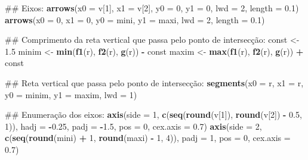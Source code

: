 \documentclass[]{book}
\newenvironment{Shaded}{\begin{snugshade}}{\end{snugshade}}
\newcommand{\KeywordTok}[1]{\textcolor[rgb]{0.13,0.29,0.53}{\textbf{#1}}}
\newcommand{\DataTypeTok}[1]{\textcolor[rgb]{0.13,0.29,0.53}{#1}}
\newcommand{\DecValTok}[1]{\textcolor[rgb]{0.00,0.00,0.81}{#1}}
\newcommand{\FloatTok}[1]{\textcolor[rgb]{0.00,0.00,0.81}{#1}}
\newcommand{\StringTok}[1]{\textcolor[rgb]{0.31,0.60,0.02}{#1}}
\newcommand{\OperatorTok}[1]{\textcolor[rgb]{0.81,0.36,0.00}{\textbf{#1}}}
\newcommand{\NormalTok}[1]{#1}
\begin{document}
\begin{enumerate}
\begin{Shaded}
\begin{Highlighting}[]
\NormalTok{##  Eixos:}
\KeywordTok{arrows}\NormalTok{(}\DataTypeTok{x0 =}\NormalTok{ v[}\DecValTok{1}\NormalTok{], }\DataTypeTok{x1 =}\NormalTok{ v[}\DecValTok{2}\NormalTok{],}
   \DataTypeTok{y0 =} \DecValTok{0}\NormalTok{, }\DataTypeTok{y1 =} \DecValTok{0}\NormalTok{, }\DataTypeTok{lwd =} \DecValTok{2}\NormalTok{, }\DataTypeTok{length =} \FloatTok{0.1}\NormalTok{)}
\KeywordTok{arrows}\NormalTok{(}\DataTypeTok{x0 =} \DecValTok{0}\NormalTok{, }\DataTypeTok{x1 =} \DecValTok{0}\NormalTok{,}
   \DataTypeTok{y0 =}\NormalTok{ mini, }\DataTypeTok{y1 =}\NormalTok{ maxi, }\DataTypeTok{lwd =} \DecValTok{2}\NormalTok{, }\DataTypeTok{length =} \FloatTok{0.1}\NormalTok{)}

\NormalTok{##  Comprimento da reta vertical que passa pelo ponto de intersecção:}
\NormalTok{const <-}\StringTok{ }\FloatTok{1.5}
\NormalTok{minim <-}\StringTok{ }\KeywordTok{min}\NormalTok{(}\KeywordTok{f1}\NormalTok{(r), }\KeywordTok{f2}\NormalTok{(r), }\KeywordTok{g}\NormalTok{(r)) }\OperatorTok{-}\StringTok{ }\NormalTok{const}
\NormalTok{maxim <-}\StringTok{ }\KeywordTok{max}\NormalTok{(}\KeywordTok{f1}\NormalTok{(r), }\KeywordTok{f2}\NormalTok{(r), }\KeywordTok{g}\NormalTok{(r)) }\OperatorTok{+}\StringTok{ }\NormalTok{const}

\NormalTok{##  Reta vertical que passa pelo ponto de intersecção:}
\KeywordTok{segments}\NormalTok{(}\DataTypeTok{x0 =}\NormalTok{ r, }\DataTypeTok{x1 =}\NormalTok{ r,}
     \DataTypeTok{y0 =}\NormalTok{ minim, }\DataTypeTok{y1 =}\NormalTok{ maxim, }\DataTypeTok{lwd =} \DecValTok{1}\NormalTok{)}

\NormalTok{##  Enumeração dos eixos:}
\KeywordTok{axis}\NormalTok{(}\DataTypeTok{side =} \DecValTok{1}\NormalTok{, }\KeywordTok{c}\NormalTok{(}\KeywordTok{seq}\NormalTok{(}\KeywordTok{round}\NormalTok{(v[}\DecValTok{1}\NormalTok{]), }\KeywordTok{round}\NormalTok{(v[}\DecValTok{2}\NormalTok{]) }\OperatorTok{-}\StringTok{ }\FloatTok{0.5}\NormalTok{, }\DecValTok{1}\NormalTok{)),}
 \DataTypeTok{hadj =} \OperatorTok{-}\FloatTok{0.25}\NormalTok{, }\DataTypeTok{padj =} \OperatorTok{-}\FloatTok{1.5}\NormalTok{, }\DataTypeTok{pos =} \DecValTok{0}\NormalTok{, }\DataTypeTok{cex.axis =} \FloatTok{0.7}\NormalTok{)}
\KeywordTok{axis}\NormalTok{(}\DataTypeTok{side =} \DecValTok{2}\NormalTok{, }\KeywordTok{c}\NormalTok{(}\KeywordTok{seq}\NormalTok{(}\KeywordTok{round}\NormalTok{(mini) }\OperatorTok{+}\StringTok{ }\DecValTok{1}\NormalTok{, }\KeywordTok{round}\NormalTok{(maxi) }\OperatorTok{-}\StringTok{ }\DecValTok{1}\NormalTok{, }\DecValTok{4}\NormalTok{)),}
 \DataTypeTok{padj =} \DecValTok{1}\NormalTok{, }\DataTypeTok{pos =} \DecValTok{0}\NormalTok{, }\DataTypeTok{cex.axis =} \FloatTok{0.7}\NormalTok{)}


\end{Highlighting}
\end{Shaded}
\end{enumerate}
\end{document}
